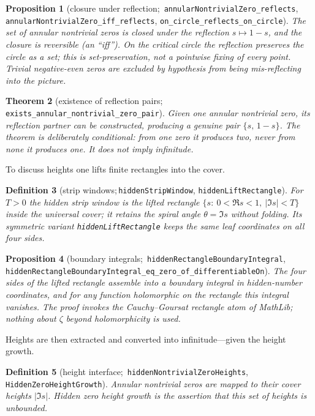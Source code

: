 \documentclass[submission]{jsfds}
\newtheorem{theorem}{Theorem}
\newtheorem{proposition}[theorem]{Proposition}
\newtheorem{definition}[theorem]{Definition}
\newcommand{\Lean}[1]{\texttt{#1}}
\newcommand{\abs}[1]{\lvert #1\rvert}
\begin{document}
\begin{proposition}[closure under reflection;\,
\Lean{annularNontrivialZero_reflects},
\Lean{annularNontrivialZero_iff_reflects},
\Lean{on_circle_reflects_on_circle}]\label{prop:closes}
The set of annular nontrivial zeros is closed under the reflection $s\mapsto
1-s$, and the closure is reversible (an ``iff''). On the critical circle the
reflection preserves the circle as a \emph{set}; this is set-preservation, not
a pointwise fixing of every point. Trivial negative-even zeros are excluded by
hypothesis from being mis-reflecting into the picture.
\end{proposition}

\begin{theorem}[existence of reflection pairs;\,
\Lean{exists_annular_nontrivial_zero_pair}]\label{thm:pairs}
Given one annular nontrivial zero, its reflection partner can be constructed,
producing a genuine pair $\{s,\,1-s\}$. The theorem is deliberately
\emph{conditional}: from one zero it produces two, never from none it produces
one. It does not imply infinitude.
\end{theorem}

To discuss heights one lifts finite rectangles into the cover.

\begin{definition}[strip windows;\,\Lean{hiddenStripWindow},
\Lean{hiddenLiftRectangle}]\label{def:window}
For $T>0$ the \emph{hidden strip window} is the lifted rectangle
$\{s:\ 0<\Re s<1,\ \abs{\Im s}<T\}$ inside the universal cover; it retains the
spiral angle $\theta=\Im s$ without folding. Its symmetric variant
\Lean{hiddenLiftRectangle} keeps the same leaf coordinates on all four sides.
\end{definition}

\begin{proposition}[boundary integrals;\,
\Lean{hiddenRectangleBoundaryIntegral},
\Lean{hiddenRectangleBoundaryIntegral_eq_zero_of_differentiableOn}]
\label{prop:boundaryint}
The four sides of the lifted rectangle assemble into a boundary integral in
hidden-number coordinates, and for any function holomorphic on the rectangle
this integral vanishes. The proof invokes the Cauchy--Goursat rectangle atom of
MathLib; nothing about $\zeta$ beyond holomorphicity is used.
\end{proposition}

Heights are then extracted and converted into infinitude---given the height
growth.

\begin{definition}[height interface;\,
\Lean{hiddenNontrivialZeroHeights},
\Lean{HiddenZeroHeightGrowth}]\label{def:heightgrowth}
Annular nontrivial zeros are mapped to their cover heights
$\abs{\Im s}$. \emph{Hidden zero height growth} is the assertion that this set
of heights is unbounded.
\end{definition}
\end{document}

